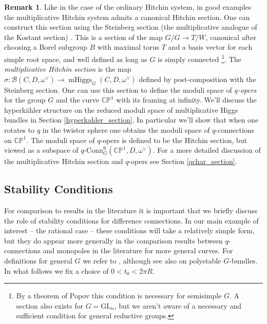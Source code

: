 \documentclass[11pt, oneside, reqno]{amsart}
\theoremstyle{definition} \newtheorem{definition}{Definition}[section]
\theoremstyle{definition} \newtheorem{remark}[definition]{Remark}
\theoremstyle{definition} \newtheorem{remarks}[definition]{Remarks}
\theoremstyle{definition} \newtheorem{question}[definition]{Question}
\theoremstyle{definition} \newtheorem*{note}{Note}
\theoremstyle{definition} \newtheorem{example}[definition]{Example}
\theoremstyle{definition} \newtheorem{examples}[definition]{Examples}
\newcommand{\bb}[1]{\mathbb{#1}}
\newcommand{\mc}[1]{\mathcal{#1}}
\newcommand{\GL}{\mathrm{GL}}
\DeclareMathOperator{\mhiggs}{mHiggs}
\newcommand{\qconn}{q\text{-Conn}}
\newcommand{\fr}{\mathrm{fr}}
\begin{document}
\begin{remark} \label{q_opers_remark}
Like in the case of the ordinary Hitchin system, in good examples the multiplicative Hitchin system admits a canonical Hitchin section.  One can construct this section using the Steinberg section (the multiplicative analogue of the Kostant section) \cite{Steinberg}.  This is a section of the map $G/G \to T/W$, canonical after choosing a Borel subgroup $B$ with maximal torus $T$ and a basis vector for each simple root space, and well defined as long as $G$ is simply connected \footnote{By a theorem of Popov \cite{Popov} this condition is necessary for semisimple $G$.  A section also exists for $G = \GL_n$, but we aren't aware of a necessary and sufficient condition for general reductive groups.}.  The \emph{multiplicative Hitchin section} is the map $\sigma \colon \mc B(C,D,\omega^\vee) \to \mhiggs_G(C,D,\omega^\vee)$ defined by post-composition with the Steinberg section.  One can use this section to define the moduli space of \emph{$q$-opers} for the group $G$ and the curve $\bb{CP}^1$ with its framing at infinity.  We'll discuss the hyperk\"ahler structure on the reduced moduli space of multiplicative Higgs bundles in Section \ref{hyperkahler_section}.  In particular we'll show that when one rotates to $q$ in the twistor sphere one obtains the moduli space of $q$-connections on $\bb{CP}^1$.  The moduli space of $q$-opers is defined to be the Hitchin section, but viewed as a subspace of $\qconn^{\fr}_G(\bb{CP}^1,D,\omega^\vee)$.  For a more detailed discussion of the multiplicative Hitchin section and $q$-opers see Section \ref{qchar_section}. 
\end{remark}

\subsection{Stability Conditions} \label{stability_section}
For comparison to results in the literature it is important that we briefly discuss the role of stability conditions for difference connections.  In our main example of interest -- the rational case -- these conditions will take a relatively simple form, but they do appear more generally in the comparison results between $q$-connections and monopoles in the literature for more general curves.  For definitions for general $G$ we refer to \cite{Smith}, although see also \cite{AnchoucheBiswas} on polystable $G$-bundles.  In what follows we fix a choice of $0 < t_0 < 2\pi R$.
\end{document}
